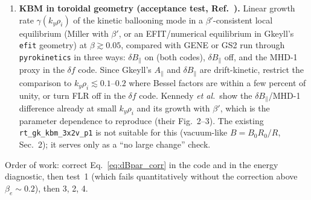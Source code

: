 \documentclass[11pt, letterpaper]{article}
\newcommand{\dBpar}{\delta B_\parallel}
\newcommand{\Apar}{A_\parallel}
\newcommand{\code}[1]{\texttt{#1}}
\begin{document}
\begin{enumerate}
  mirror mode is a pure $\dBpar$ effect: it does not exist at all with $\dBpar$ off. Threshold
  $\Lambda\equiv\sum_s\beta_{\perp s}(T_{\perp s}/T_{\parallel s}-1) = 1$ (Hasegawa 1969;
  Southwood \& Kivelson 1993), growth rate near threshold
  $\gamma \simeq \sqrt{2/\pi}\,|k_\parallel| v_{t\parallel i}\,(\Lambda-1)\,\big/\,\big[\ldots\big]$
  from the drift-kinetic limit of Eq.~\eqref{eq:disp} with bi-Maxwellian $W$ functions (the
  $\omega\to0$ non-resonant response gives the threshold, the resonant $\xi\to0$ part the growth
  rate; see Hellinger 2007 for the closed form with electrons). Procedure: 2x2v slab with
  $k_\perp\gg k_\parallel$ (or 1x2v with \code{kperpSq}), ions with $T_{\perp i}/T_{\parallel i}\in[1,3]$,
  isotropic electrons, scan $\Lambda$ across 1; measure $\gamma$ from the $\dBpar$ energy; check
  the threshold and the slope $d\gamma/d\Lambda$. This is the most sensitive test of the
  $(1+\beta_\perp)$ factor: without it the threshold moves to $\sum_s\beta_{\perp s}T_{\perp s}/T_{\parallel s}=1$,
  i.e.\ an isotropic plasma would go unstable at $\beta_\perp=1$. Note that the bi-Maxwellian
  projection and the LBO/BGK operators use $B_0$; run collisionless.
  \item \textbf{KBM in toroidal geometry (acceptance test, Ref.~\cite{Kennedy2024}).}
  Linear growth rate $\gamma(k_y\rho_i)$ of the kinetic ballooning mode in a $\beta'$-consistent
  local equilibrium (Miller with $\beta'$, or an EFIT/numerical equilibrium in Gkeyll's
  \code{efit} geometry) at $\beta\gtrsim0.05$, compared with GENE or GS2 run through
  \code{pyrokinetics} in three ways: $\dBpar$ on (both codes), $\dBpar$ off, and the MHD-1 proxy
  in the $\delta f$ code. Since Gkeyll's $\Apar$ and $\dBpar$ are drift-kinetic, restrict the
  comparison to $k_y\rho_i\lesssim0.1$--$0.2$ where Bessel factors are within a few percent of
  unity, or turn FLR off in the $\delta f$ code. Kennedy \emph{et al.}\ show the $\dBpar$/MHD-1
  difference already at small $k_y\rho_i$ and its growth with $\beta'$, which is the parameter
  dependence to reproduce (their Fig.~2--3). The existing \code{rt\_gk\_kbm\_3x2v\_p1} is not
  suitable for this (vacuum-like $B=B_0R_0/R$, Sec.~2); it serves only as a ``no large change''
  check.
\end{enumerate}
Order of work: correct Eq.~\eqref{eq:dBpar_corr} in the code and in the energy diagnostic, then
test~1 (which fails quantitatively without the correction above $\beta_e\sim0.2$), then 3, 2, 4.
\end{document}
